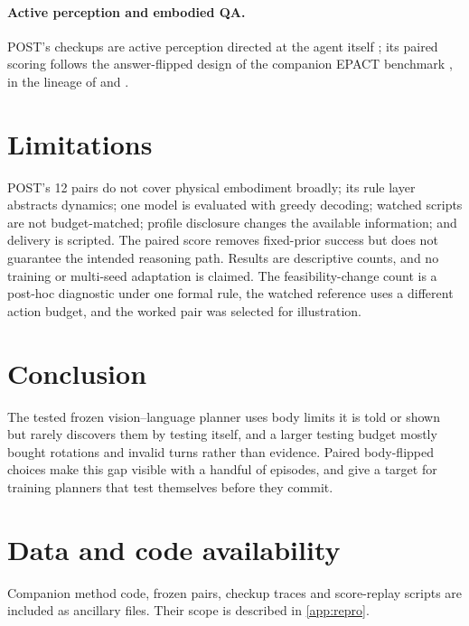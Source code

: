 \documentclass{article}
\begin{document}
\paragraph{Active perception and embodied QA.} POST's checkups are active perception directed at the agent itself \citep{bajcsy1988active,bohg2017interactive}; its paired scoring follows the answer-flipped design of the companion EPACT benchmark \citep{yang2026epact}, in the lineage of \citet{das2018embodied} and \citet{majumdar2024openeqa}.

\section{Limitations}
POST's 12 pairs do not cover physical embodiment broadly; its rule layer abstracts dynamics; one model is evaluated with greedy decoding; watched scripts are not budget-matched; profile disclosure changes the available information; and delivery is scripted. The paired score removes fixed-prior success but does not guarantee the intended reasoning path. Results are descriptive counts, and no training or multi-seed adaptation is claimed. The feasibility-change count is a post-hoc diagnostic under one formal rule, the watched reference uses a different action budget, and the worked pair was selected for illustration.

\section{Conclusion}
The tested frozen vision--language planner uses body limits it is told or shown but rarely discovers them by testing itself, and a larger testing budget mostly bought rotations and invalid turns rather than evidence. Paired body-flipped choices make this gap visible with a handful of episodes, and give a target for training planners that test themselves before they commit.

\section*{Data and code availability}
Companion method code, frozen pairs, checkup traces and score-replay scripts are included as ancillary files. Their scope is described in \cref{app:repro}.




\appendix
\end{document}
